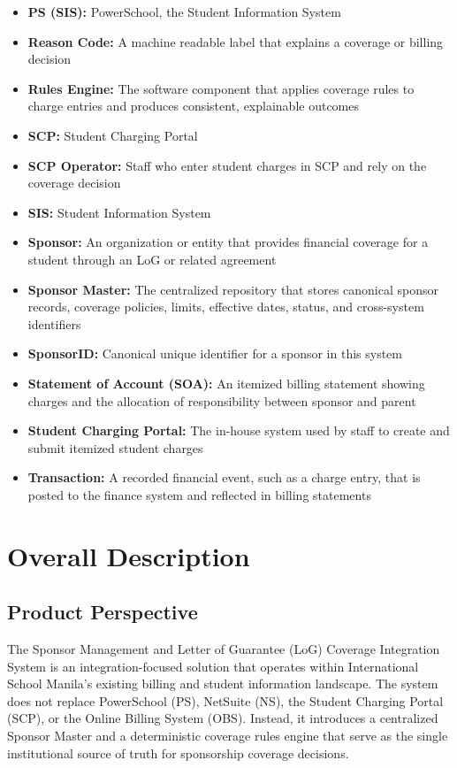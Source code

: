 \documentclass[12pt,a4paper]{article}
\begin{document}
\begin{itemize}
  \item \textbf{PS (SIS):} PowerSchool, the Student Information System
  \item \textbf{Reason Code:} A machine readable label that explains a coverage or billing decision
  \item \textbf{Rules Engine:} The software component that applies coverage rules to charge entries and produces consistent, explainable outcomes
  \item \textbf{SCP:} Student Charging Portal
  \item \textbf{SCP Operator:} Staff who enter student charges in SCP and rely on the coverage decision
  \item \textbf{SIS:} Student Information System
  \item \textbf{Sponsor:} An organization or entity that provides financial coverage for a student through an LoG or related agreement
  \item \textbf{Sponsor Master:} The centralized repository that stores canonical sponsor records, coverage policies, limits, effective dates, status, and cross-system identifiers
  \item \textbf{SponsorID:} Canonical unique identifier for a sponsor in this system
  \item \textbf{Statement of Account (SOA):} An itemized billing statement showing charges and the allocation of responsibility between sponsor and parent
  \item \textbf{Student Charging Portal:} The in-house system used by staff to create and submit itemized student charges
  \item \textbf{Transaction:} A recorded financial event, such as a charge entry, that is posted to the finance system and reflected in billing statements
\end{itemize}


\section{Overall Description}

\subsection{Product Perspective}
The Sponsor Management and Letter of Guarantee (LoG) Coverage Integration System is an integration-focused solution that operates within International School Manila’s existing billing and student information landscape. The system does not replace PowerSchool (PS), NetSuite (NS), the Student Charging Portal (SCP), or the Online Billing System (OBS). Instead, it introduces a centralized Sponsor Master and a deterministic coverage rules engine that serve as the single institutional source of truth for sponsorship coverage decisions.
\end{document}
